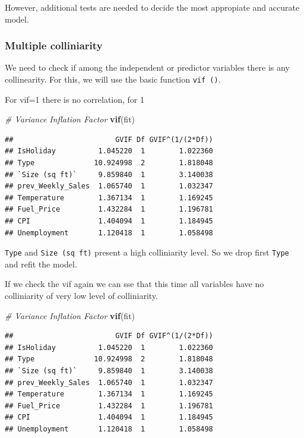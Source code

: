 \documentclass[11pt,]{article}
\newenvironment{Shaded}{\begin{snugshade}}{\end{snugshade}}
\newcommand{\KeywordTok}[1]{\textcolor[rgb]{0.13,0.29,0.53}{\textbf{{#1}}}}
\newcommand{\CommentTok}[1]{\textcolor[rgb]{0.56,0.35,0.01}{\textit{{#1}}}}
\newcommand{\NormalTok}[1]{{#1}}
\begin{document}
However, additional tests are needed to decide the most appropiate and
accurate model.

\subsubsection{Multiple colliniarity}\label{multiple-colliniarity}

We need to check if among the independent or predictor variables there
is any collinearity. For this, we will use the basic function
\texttt{vif\ ()}.

For vif=1 there is no correlation, for 1

\begin{Shaded}
\begin{Highlighting}[]
\CommentTok{# Variance Inflation Factor}
\KeywordTok{vif}\NormalTok{(fit)}
\end{Highlighting}
\end{Shaded}

\begin{verbatim}
##                        GVIF Df GVIF^(1/(2*Df))
## IsHoliday          1.045220  1        1.022360
## Type              10.924998  2        1.818048
## `Size (sq ft)`     9.859840  1        3.140038
## prev_Weekly_Sales  1.065740  1        1.032347
## Temperature        1.367134  1        1.169245
## Fuel_Price         1.432284  1        1.196781
## CPI                1.404094  1        1.184945
## Unemployment       1.120418  1        1.058498
\end{verbatim}

\texttt{Type} and \texttt{Size\ (sq\ ft)} present a high colliniarity
level. So we drop first \texttt{Type} and refit the model.

If we check the vif again we can sse that this time all variables have
no colliniarity of very low level of colliniarity.

\begin{Shaded}
\begin{Highlighting}[]
\CommentTok{# Variance Inflation Factor}
\KeywordTok{vif}\NormalTok{(fit)}
\end{Highlighting}
\end{Shaded}

\begin{verbatim}
##                        GVIF Df GVIF^(1/(2*Df))
## IsHoliday          1.045220  1        1.022360
## Type              10.924998  2        1.818048
## `Size (sq ft)`     9.859840  1        3.140038
## prev_Weekly_Sales  1.065740  1        1.032347
## Temperature        1.367134  1        1.169245
## Fuel_Price         1.432284  1        1.196781
## CPI                1.404094  1        1.184945
## Unemployment       1.120418  1        1.058498
\end{verbatim}
\end{document}
